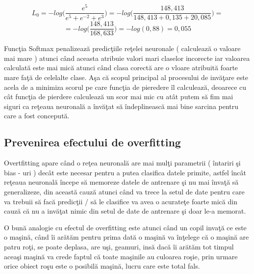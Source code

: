 $$L_0 = - log \bigg(\frac{e^{5}}{e^{5} + e^{-2} + e^{3}} \bigg) = - log \bigg(\frac{148,413}{148,413 + 0,135 + 20,085}\bigg) =  $$
$$ = - log\bigg( \frac{148,413}{168,633} \bigg) = -log(0,88) = 0,055 $$

Func\c{t}ia Softmax penalizeaz\u{a} predic\c{t}iile re\c{t}elei neuronale ( calculeaz\u{a} o valoare mai mare ) atunci c\^{a}nd aceasta atribuie valori mari claselor incorecte iar valoarea calculat\u{a} este mai mic\u{a} atunci c\^{a}nd clasa corect\u{a} are o vloare atribuit\u{a} foarte mare fa\c{t}\u{a} de celelalte clase. A\c{s}a c\u{a} scopul principal al procesului de inv\u{a}\c{t}are este acela de a minimiza scorul pe care func\c{t}ia de pieredere \^{i}l calculeaz\u{a}, deoarece cu c\^{a}t func\c{t}ia de pierdere calculeaz\u{a} un scor mai mic cu at\^{a}t putem s\u{a} fim mai siguri ca re\c{t}eaua neuronal\u{a} a \^{i}nv\u{a}\c{t}at s\u{a} \^{i}ndeplineasc\u{a} mai bine sarcina pentru care a fost conceput\u{a}.

\subsection{Prevenirea efectului de overfitting}

Overtfitting apare c\^{a}nd o re\c{t}ea neuronal\u{a} are mai mul\c{t}i parametrii ( \^{i}ntariri \c{s}i bias - uri ) dec\^{a}t este necesar pentru a putea clasifica datele primite, astfel \^{i}nc\^{a}t re\c{t}eaua neuronal\u{a} \^{i}ncepe s\u{a} memoreze datele de antrenare \c{s}i nu mai \^{i}nva\c{t}\u{a} s\u{a} generalizeze, din aceast\u{a} cauz\u{a} atunci c\^{a}nd va trece la setul de date pentru care va trebuii s\u{a} fac\u{a} predic\c{t}ii / s\u{a} le clasifice va avea o acurate\c{t}e foarte mic\u{a} din cauz\u{a} c\u{a} nu a inv\u{a}\c{t}at nimic din setul de date de antrenare \c{s}i doar le-a memorat.

\par 

O bun\u{a} analogie cu efectul de overfitting este atunci c\^{a}nd un copil inva\c{t}\u{a} ce este o ma\c{s}in\u{a}, c\^{a}nd \^{i}i ar\u{a}t\u{a}m pentru prima dat\u{a} o ma\c{s}in\u{a} va \^{i}n\c{t}elege c\u{a} o ma\c{s}in\u{a} are patru ro\c{t}i, se poate deplasa, are u\c{s}i, geamuri, ins\u{a} dac\u{a} \^{i}i ar\u{a}t\u{a}m tot timpul acea\c{s}i ma\c{s}in\u{a} va crede faptul c\u{a} toate ma\c{s}inile au culoarea ro\c{s}ie, prin urmare orice obiect ro\c{s}u este o posibil\u{a} ma\c{s}in\u{a}, lucru care este total fals.

\par

